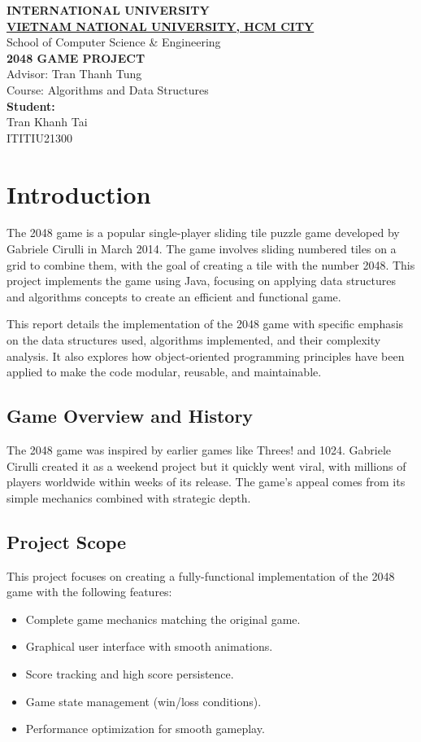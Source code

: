 \documentclass[12pt, a4paper]{article}
\newcommand{\titlepagetext}{
  \vspace*{1cm}
  \begin{center}
    {\Large\bfseries\textcolor{navyblue}{INTERNATIONAL UNIVERSITY}}\\[0.3cm]
    {\Large\bfseries\textcolor{navyblue}{\underline{VIETNAM NATIONAL UNIVERSITY, HCM CITY}}}\\[1cm]
    {\large\textcolor{navyblue}{School of Computer Science \& Engineering}}\\[2cm]
    
    {\LARGE\bfseries\textcolor{titlered}{2048 GAME PROJECT}}\\[2cm]
    
    {\large\textcolor{navyblue}{Advisor: Tran Thanh Tung}}\\[0.5cm]
    {\large\textcolor{navyblue}{Course: Algorithms and Data Structures}}\\[2cm]
    
    \large\textbf{\textcolor{navyblue}{Student:}}\\[1cm]
    \large\textcolor{navyblue}{Tran Khanh Tai}\\
    \large\textcolor{navyblue}{ITITIU21300}\\[1cm]
  \end{center}
}
\begin{document}
\begin{titlepage}
\thispagestyle{empty} %

\vspace{2cm}

\titlepagetext

\end{titlepage}

\tableofcontents
\clearpage

\listoftables
\clearpage

\lstlistoflistings
\clearpage

\listofcodeexample
\clearpage

\section{Introduction}
The 2048 game is a popular single-player sliding tile puzzle game developed by Gabriele Cirulli in March 2014. The game involves sliding numbered tiles on a grid to combine them, with the goal of creating a tile with the number 2048. This project implements the game using Java, focusing on applying data structures and algorithms concepts to create an efficient and functional game.

This report details the implementation of the 2048 game with specific emphasis on the data structures used, algorithms implemented, and their complexity analysis. It also explores how object-oriented programming principles have been applied to make the code modular, reusable, and maintainable.

\subsection{Game Overview and History}
The 2048 game was inspired by earlier games like Threes! and 1024. Gabriele Cirulli created it as a weekend project but it quickly went viral, with millions of players worldwide within weeks of its release. The game's appeal comes from its simple mechanics combined with strategic depth.

\subsection{Project Scope}
This project focuses on creating a fully-functional implementation of the 2048 game with the following features:
\begin{itemize}
    \item Complete game mechanics matching the original game.
    \item Graphical user interface with smooth animations.
    \item Score tracking and high score persistence.
    \item Game state management (win/loss conditions).
    \item Performance optimization for smooth gameplay.
\end{itemize}
\end{document}
